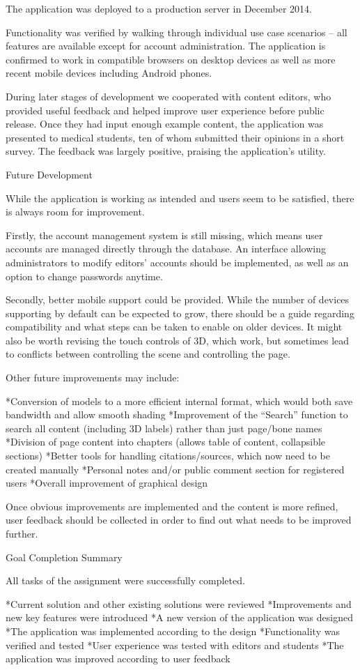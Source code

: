 The application was deployed to a production server in December 2014.

Functionality was verified by walking through individual use case scenarios -- all features are available except for account administration. The application is confirmed to work in  compatible browsers on desktop devices as well as more recent mobile devices including Android phones.

During later stages of development we cooperated with content editors, who provided useful feedback and helped improve user experience before public release. Once they had input enough example content, the application was presented to medical students, ten of whom submitted their opinions in a short survey. The feedback was largely positive, praising the application’s utility.

\sec Future Development

While the application is working as intended and users seem to be satisfied, there is always room for improvement.

Firstly, the account management system is still missing, which means user accounts are managed directly through the database. An interface allowing administrators to modify editors’ accounts should be implemented, as well as an option to change passwords anytime.

Secondly, better mobile support could be provided. While the number of devices supporting  by default can be expected to grow, there should be a guide regarding compatibility and what steps can be taken to enable  on older devices. It might also be worth revising the touch controls of 3D, which work, but sometimes lead to conflicts between controlling the scene and controlling the page.

Other future improvements may include:

\begitems
*Conversion of models to a more efficient internal format, which would both save bandwidth and allow smooth shading
*Improvement of the “Search” function to search all content (including 3D labels) rather than just page/bone names
*Division of page content into chapters (allows table of content, collapsible sections)
*Better tools for handling citations/sources, which now need to be created manually
*Personal notes and/or public comment section for registered users
*Overall improvement of graphical design
\enditems

Once obvious improvements are implemented and the content is more refined, user feedback should be collected in order to find out what needs to be improved further.

\sec Goal Completion Summary

All tasks of the assignment were successfully completed.

\begitems
*Current solution and other existing solutions were reviewed
*Improvements and new key features were introduced
*A new version of the application was designed
*The application was implemented according to the design
*Functionality was verified and tested
*User experience was tested with editors and students
*The application was improved according to user feedback
\enditems